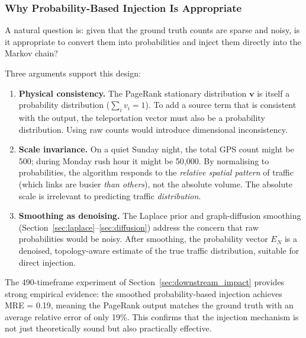 \documentclass[12pt,a4paper]{article}
\theoremstyle{definition}
\theoremstyle{plain}
\begin{document}
\subsubsection{Why Probability-Based Injection Is Appropriate}

A natural question is: given that the ground truth counts are sparse and noisy,
is it appropriate to convert them into probabilities and inject them directly
into the Markov chain?

Three arguments support this design:

\begin{enumerate}[label=\textbf{A\arabic*.}]
  \item \textbf{Physical consistency.} The PageRank stationary distribution
    $\mathbf{v}$ is itself a probability distribution ($\sum_i v_i = 1$). To
    add a source term that is consistent with the output, the teleportation
    vector must also be a probability distribution. Using raw counts would
    introduce dimensional inconsistency.

  \item \textbf{Scale invariance.} On a quiet Sunday night, the total GPS count
    might be 500; during Monday rush hour it might be 50{,}000. By normalising
    to probabilities, the algorithm responds to the \emph{relative spatial
    pattern} of traffic (which links are busier \emph{than others}), not the
    absolute volume. The absolute scale is irrelevant to predicting traffic
    \emph{distribution}.

  \item \textbf{Smoothing as denoising.} The Laplace prior and graph-diffusion
    smoothing (Section~\ref{sec:laplace}--\ref{sec:diffusion}) address the
    concern that raw probabilities would be noisy. After smoothing, the
    probability vector $E_N$ is a denoised, topology-aware estimate of the
    true traffic distribution, suitable for direct injection.
\end{enumerate}

\begin{result}
  The 490-timeframe experiment of Section~\ref{sec:downstream_impact} provides
  strong empirical evidence: the smoothed probability-based injection achieves
  MRE = 0.19, meaning the PageRank output matches the ground truth with an
  average relative error of only 19\%. This confirms that the injection mechanism
  is not just theoretically sound but also practically effective.
\end{result}

\end{document}
